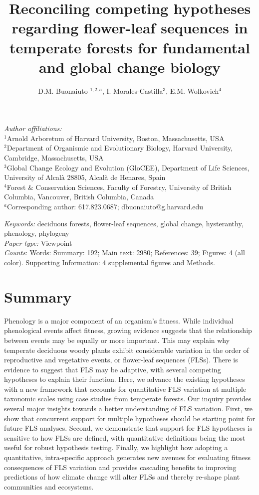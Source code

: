 \documentclass[11pt]{article}
\title{Reconciling competing hypotheses regarding flower-leaf sequences in temperate forests for fundamental and global change biology}
\date{}
\author{D.M. Buonaiuto $^{1,2,a}$, I. Morales-Castilla$^{3}$, E.M. Wolkovich$^{4}$}
\begin{document}
\maketitle
\linenumbers
\noindent \emph{Author affiliations:}\\
\noindent $^1$Arnold Arboretum of Harvard University, Boston, Massachusetts, USA\\
$^2$Department of Organismic and Evolutionary Biology, Harvard University, Cambridge, Massachusetts, USA\\
$^3$Global Change Ecology and Evolution (GloCEE), Department of Life Sciences, University of Alcal\`a  28805, Alcal\`a de Henares, Spain\\
$^4$Forest \& Conservation Sciences, Faculty of Forestry, University of British Columbia, Vancouver, British Columbia, Canada\\
$^a$Corresponding author: 617.823.0687; dbuonaiuto@g.harvard.edu

\noindent \emph{Keywords:} deciduous forests, flower-leaf sequences, global change, hysteranthy, phenology, phylogeny \\ %
\emph{Paper type:} Viewpoint\\
 \emph{Counts}: Words: Summary: 192; Main text: 2980; References: 39;  Figures: 4 (all color). Supporting Information: 4 supplemental figures and Methods.
\newpage

\section*{Summary}
Phenology is a major component of an organism's fitness. While individual phenological events affect fitness, growing evidence suggests that the relationship between events may be equally or more important. This may explain why temperate deciduous woody plants exhibit considerable variation in the order of reproductive and vegetative events, or flower-leaf sequences (FLSs). There is evidence to suggest that FLS may be adaptive, with several competing hypotheses to explain their function. Here, we advance the existing hypotheses with a new framework that accounts for quantitative FLS variation at multiple taxonomic scales using case studies from temperate forests. Our inquiry provides several major insights towards a better understanding of FLS variation. First, we show that concurrent support for multiple hypotheses should be starting point for future FLS analyses. Second, we demonstrate that support for FLS hypotheses is sensitive to how FLSs are defined, with quantitative definitions being the most useful for robust hypothesis testing. Finally, we highlight how adopting a quantitative, intra-specific approach generates new avenues for evaluating fitness consequences of FLS variation and provides cascading benefits to improving predictions of how climate change will alter FLSs and thereby re-shape plant communities and ecosystems.
\end{document}
